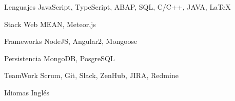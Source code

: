 


\begin{cvskills}


\cvskill
{Lenguajes} %
{JavaScript, TypeScript, ABAP, SQL, C/C++, JAVA, \LaTeX{} } %


\cvskill
{Stack Web} %
{MEAN, Meteor.js} %

\cvskill
{Frameworks} %
{NodeJS, Angular2, Mongoose} %


\cvskill
{Persistencia} %
{MongoDB, PosgreSQL} %

\cvskill
{TeamWork} %
{Scrum, Git, Slack, ZenHub, JIRA, Redmine} %

\cvskill
{Idiomas} %
{Inglés} %


\end{cvskills}
